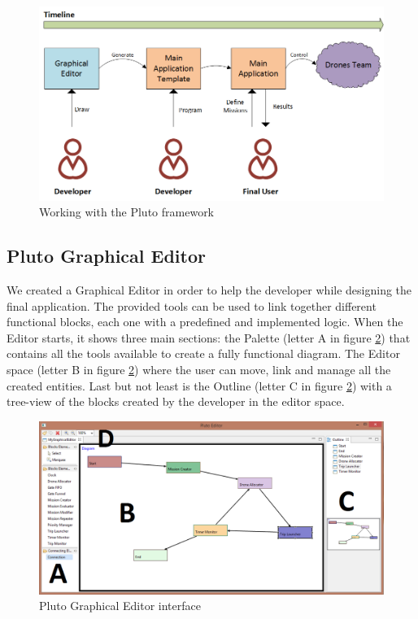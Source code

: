 \begin{figure}[htb]
  \centering
  \includegraphics[width=\linewidth]{pictures/lifeCycle.png}
  \caption{Working with the Pluto framework}
  \label{fig:lifeCycle}
\end{figure}

\subsection{Pluto Graphical Editor}
\label{plutoGraphicalEditor}

We created a Graphical Editor in order to help the developer while designing the final application.
The provided tools can be used to link together different functional blocks, each one with a predefined and implemented logic.
When the Editor starts, it shows three main sections: 
the Palette (letter A in figure \ref{fig:GraphicalEditor}) that contains all the tools available to create a fully functional diagram.
The Editor space (letter B in figure \ref{fig:GraphicalEditor}) where the user can move, link and manage all the created entities.
Last but not least is the Outline (letter C in figure \ref{fig:GraphicalEditor}) with a tree-view of the blocks created by the developer in the editor space.

\begin{figure}[htb]
  \centering
  \includegraphics[width=\linewidth]{pictures/EditorScreen.png}
  \caption{Pluto Graphical Editor interface}
  \label{fig:GraphicalEditor}
\end{figure}

